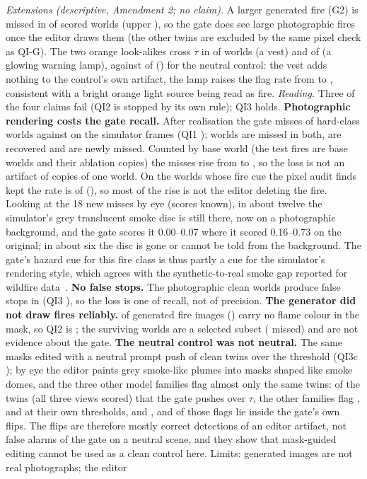 \emph{Extensions (descriptive, Amendment 2; no claim).} A larger generated fire (G2) is missed in \QIGTwoK{} of \QIGTwoN{} scored worlds (upper \QIGTwoUpper), so the gate does see large photographic fires once the editor draws them (the other twins are excluded by the same pixel check as QI-G). The two orange look-alikes cross $\tau$ in \QIKOneK{} of \QIKOneN{} worlds (a vest) and \QIKTwoK{} of \QIKTwoN{} (a glowing warning lamp), against \QICFlips{} of \QICN{} (\QICRate) for the neutral control: the vest adds nothing to the control's own artifact, the lamp raises the flag rate from \QICRate{} to \QIKTwoRate, consistent with a bright orange light source being read as fire.
\emph{Reading.} Three of the four claims fail (QI2 is stopped by its own rule); QI3 holds. \textbf{Photographic rendering costs the gate recall.} After realisation the gate misses \QIRMiss{} of \QIRN{} hard-class worlds against \QIBaseMiss{} on the simulator frames (QI1 \QIClaimQIOne); \QIRBoth{} worlds are missed in both, \QIRRecovered{} are recovered and \QIRNew{} are newly missed. Counted by base world (the test fires are \QIRBasesTest{} base worlds and their ablation copies) the misses rise from \QIRBasesXD{} to \QIRBasesReal{}, so the loss is not an artifact of copies of one world. On the worlds whose fire cue the pixel audit finds kept the rate is \QIRKeptMiss{} of \QIRKeptN{} (\QIRKeptRate), so most of the rise is not the editor deleting the fire. Looking at the 18 new misses by eye (scores known), in about twelve the simulator's grey translucent smoke disc is still there, now on a photographic background, and the gate scores it 0.00--0.07 where it scored 0.16--0.73 on the original; in about six the disc is gone or cannot be told from the background. The gate's hazard cue for this fire class is thus partly a cue for the simulator's rendering style, which agrees with the synthetic-to-real smoke gap reported for wildfire data~\cite{gaba2025wildfiresynthetic}. \textbf{No false stops.} The photographic clean worlds produce \QIRFalse{} false stops in \QIRCleanN{} (QI3 \QIClaimQIThree), so the loss is one of recall, not of precision. \textbf{The generator did not draw fires reliably.} \QIGExcl{} of \QIGGen{} generated fire images (\QIGExclShare) carry no flame colour in the mask, so QI2 is \QIGStopped; the \QIGN{} surviving worlds are a selected subset (\QIGMiss{} missed) and are not evidence about the gate. \textbf{The neutral control was not neutral.} The same masks edited with a neutral prompt push \QICFlips{} of \QICN{} clean twins over the threshold (QI3c \QIClaimQIThreec); by eye the editor paints grey smoke-like plumes into masks shaped like smoke domes, and the three other model families flag almost only the same twins: of the \QIGateFlipsStrict{} twins (all three views scored) that the gate pushes over $\tau$, the other families flag \QIPJudgeInternC{}, \QIPJudgeIdeficsC{} and \QIPJudgeSmolC{} at their own thresholds, and \QIPJudgeInternBoth{}, \QIPJudgeIdeficsBoth{} and \QIPJudgeSmolBoth{} of those flags lie inside the gate's own flips. The flips are therefore mostly correct detections of an editor artifact, not false alarms of the gate on a neutral scene, and they show that mask-guided editing cannot be used as a clean control here. Limits: generated images are not real photographs; the editor 